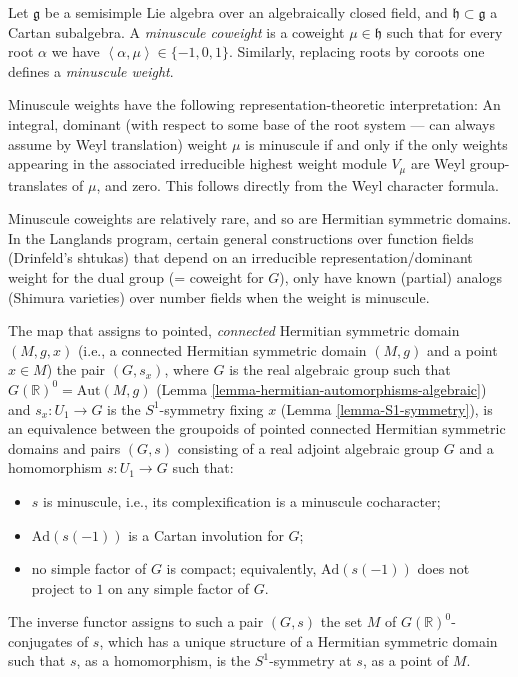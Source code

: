 \begin{definition}
 \label{definition-minuscule-weight}
Let $\mathfrak g$ be a semisimple Lie algebra over an algebraically closed field, and $\mathfrak h\subset \mathfrak g$ a Cartan subalgebra. A {\it minuscule coweight} is a coweight $\mu\in \mathfrak h$ such that for every root $\alpha$ we have $\left< \alpha, \mu\right> \in \{ -1, 0, 1\}$. Similarly, replacing roots by coroots one defines a {\it minuscule weight}.
\end{definition}

\begin{remark}
 \label{remark-minuscule-coweight}
Minuscule weights have the following representation-theoretic interpretation: An integral, dominant (with respect to some base of the root system --- can always assume by Weyl translation) weight $\mu$ is minuscule if and only if the only weights appearing in the associated irreducible highest weight module $V_\mu$ are Weyl group-translates of $\mu$, and zero. This follows directly from the Weyl character formula.

Minuscule coweights are relatively rare, and so are Hermitian symmetric domains. In the Langlands program, certain general constructions over function fields (Drinfeld's shtukas) that depend on an irreducible representation/dominant weight for the dual group (= coweight for $G$), only have known (partial) analogs (Shimura varieties) over number fields when the weight is minuscule.
\end{remark}


\begin{theorem}
 \label{theorem-classification-hermitian}
The map that assigns to pointed, \emph{connected} Hermitian symmetric domain $(M,g,x)$ (i.e., a connected Hermitian symmetric domain $(M,g)$ and a point $x\in M$) the pair $(G,s_x)$, where $G$ is the real algebraic group such that $G(\mathbb R)^0 = \text{Aut}(M,g)$ (Lemma \ref{lemma-hermitian-automorphisms-algebraic}) and $s_x:U_1\to G$ is the $S^1$-symmetry fixing $x$ (Lemma \ref{lemma-S1-symmetry}), is an equivalence between the groupoids of pointed connected Hermitian symmetric domains and pairs $(G,s)$ consisting of a real adjoint algebraic group $G$ and a homomorphism $s: U_1\to G$ such that:
\begin{itemize}
 \item $s$ is minuscule, i.e., its complexification is a minuscule cocharacter;
 \item $\text{Ad}(s(-1))$ is a Cartan involution for $G$;
 \item no simple factor of $G$ is compact; equivalently, $\text{Ad}(s(-1))$ does not project to $1$ on any simple factor of $G$. 
\end{itemize}
The inverse functor assigns to such a pair $(G,s)$ the set $M$ of $G(\mathbb R)^0$-conjugates of $s$, which has a unique structure of a Hermitian symmetric domain such that $s$, as a homomorphism, is the $S^1$-symmetry at $s$, as a point of $M$.
\end{theorem}


